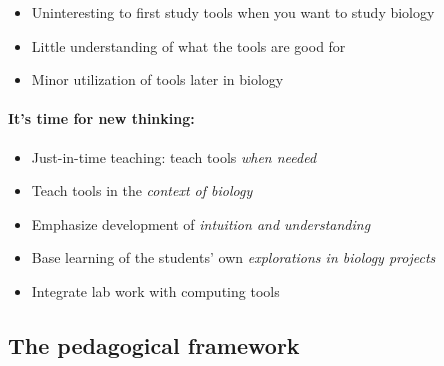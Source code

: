 \documentclass[%
twoside,                 %
final,                   %
10pt]{article}
\begin{document}
\begin{itemize}
  \item Uninteresting to first study tools when you want to study biology

  \item Little understanding of what the tools are good for

  \item Minor utilization of tools later in biology
\end{itemize}

\noindent




\paragraph{It's time for new thinking:}
\begin{itemize}
  \item Just-in-time teaching: teach tools \emph{when needed}

  \item Teach tools in the \emph{context of biology}

  \item Emphasize development of \emph{intuition and understanding}

  \item Base learning of the students' own \emph{explorations in biology projects}

  \item Integrate lab work with computing tools
\end{itemize}

\noindent




\subsection{The pedagogical framework}


\end{document}

